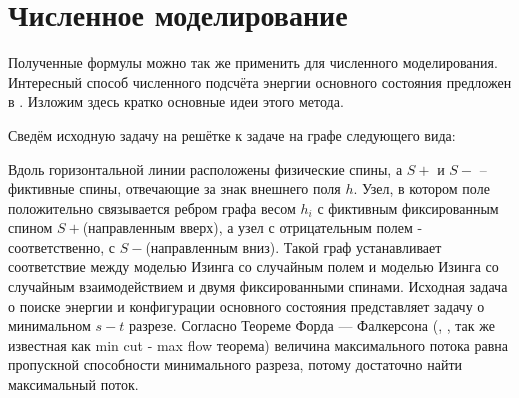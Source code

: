 \section{Численное моделирование}
Полученные формулы можно так же применить для численного моделирования.
Интересный способ численного подсчёта энергии основного состояния предложен в \cite{hartmann2004new}. Изложим здесь кратко основные идеи этого метода.

Сведём исходную задачу на решётке к задаче на графе следующего вида:

Вдоль горизонтальной линии расположены физические спины, а $S+$ и $S-$ -- фиктивные спины, отвечающие за знак внешнего поля $h$. Узел, в котором поле положительно связывается ребром графа весом $h_i$ с фиктивным фиксированным спином $S+$(направленным вверх), а узел с отрицательным полем - соответственно, с $S-$(направленным вниз). Такой граф устанавливает соответствие между моделью Изинга со случайным полем и моделью Изинга со случайным взаимодействием и двумя фиксированными спинами. Исходная задача о поиске энергии и конфигурации основного состояния представляет задачу о минимальном $s-t$ разрезе. Согласно Теореме Форда — Фалкерсона (\cite{ford1962d}, \cite{ford1956maximal}, так же известная как min cut - max flow теорема) величина максимального потока равна пропускной способности минимального разреза, потому достаточно найти максимальный поток.

